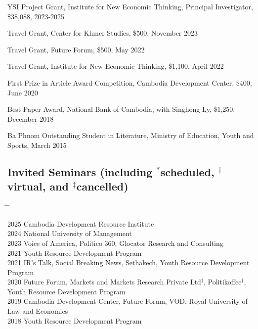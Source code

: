 \documentclass[10pt,a4paper]{article}
\newcommand{\tabbedblock}[1]{

	\begin{tabbing}
		\hspace{2cm} \= \hspace{4cm} \= \kill
		#1
	\end{tabbing}
}
\begin{document}
YSI Project Grant, Institute for New Economic Thinking, Principal Investigator, \$38,088, 2023-2025

Travel Grant, Center for Khmer Studies, \$500, November 2023

Travel Grant, Future Forum, \$500, May 2022

Travel Grant, Institute for New Economic Thinking, \$1,100, April 2022

First Prize in Article Award Competition, Cambodia Development Center, \$400, June 2020

Best Paper Award, National Bank of Cambodia, with Singhong Ly, \$1,250, December 2018 

Ba Phnom Outstanding Student in Literature, Ministry of Education, Youth and Sports, March 2015


\subsection*{Invited Seminars (including $^\ast$scheduled, $^\dag$virtual, and $^\ddag$cancelled)}

\tabbedblock{
	2025 \> Cambodia Development Resource Institute\\ 
	
	2024 \> National University of Management\\ 
	
	2023 \> Voice of America, Politico 360, Glocator Research and Consulting \\
		
	2021  \>  Youth Resource Development Program \\
	
	
	2021  \>  IR’s Talk, Social Breaking News, Sethakech, Youth Resource Development Program \\
	
	2020 \>  Future Forum, Markets and Markets Research Private Ltd$^\dag$, Politikoffee$^\dag$, \\
	\> Youth Resource Development Program \\
	
	2019 \> Cambodia Development Center, Future Forum, VOD, Royal University of Law and Economics \\
	
	2018 \> Youth Resource Development Program
}
	
\end{document}
